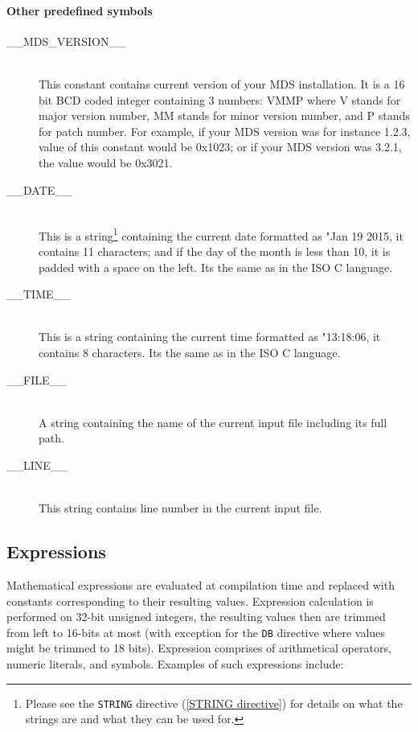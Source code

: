             \enlargethispage{2\baselineskip}
            \paragraph{Other predefined symbols}
                \begin{description}
                    \item[\_\_MDS\_VERSION\_\_]~\\
                        This constant contains current version of your MDS installation. It is a 16 bit BCD coded integer containing 3 numbers: VMMP where V stands for major version number, MM stands for minor version number, and P stands for patch number. For example, if your MDS version was for instance 1.2.3, value of this constant would be 0x1023; or if your MDS version was 3.2.1, the value would be 0x3021.
                    \item[\_\_DATE\_\_]~\\
                        This is a string\footnote{Please see the \texttt{STRING} directive (\ref{STRING directive}) for details on what the strings are and what they can be used for.} containing the current date formatted as "Jan 19 2015, it contains 11 characters; and if the day of the month is less than 10, it is padded with a space on the left. Its the same as in the ISO C language.
                    \item[\_\_TIME\_\_]~\\
                        This is a string containing the current time formatted as "13:18:06, it contains 8 characters. Its the same as in the ISO C language.
                    \item[\_\_FILE\_\_]~\\
                        A string containing the name of the current input file including its full path.
                    \item[\_\_LINE\_\_]~\\
                        This string contains line number in the current input file.
                \end{description}

    \subsection{Expressions}
        Mathematical expressions are evaluated at compilation time and replaced with constants corresponding to their resulting values. Expression calculation is performed on 32-bit unsigned integers, the resulting values then are trimmed from left to 16-bits at most (with exception for the \texttt{DB} directive where values might be trimmed to 18 bits). Expression comprises of arithmetical operators, numeric literals, and symbols. Examples of such expressions include:

